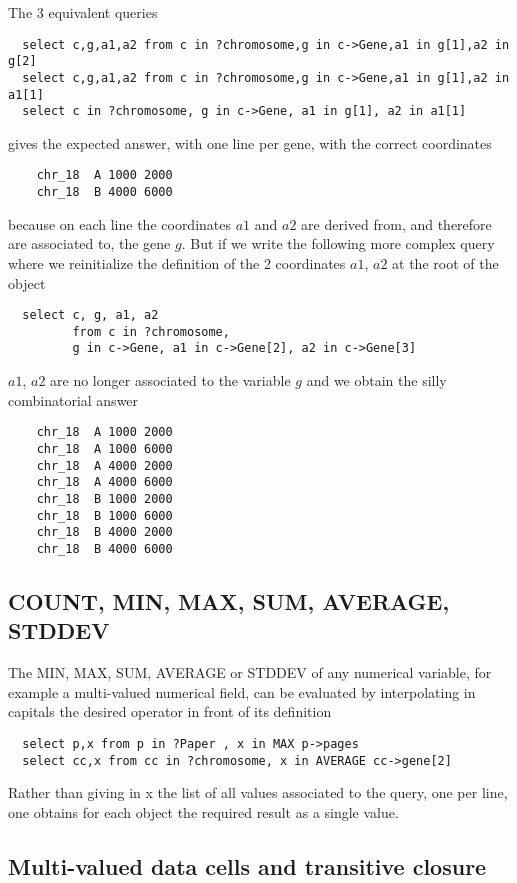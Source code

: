 \documentclass[11pt]{article}
\newcommand{\BL}{\begin{lstlisting}}
\begin{document}
The 3 equivalent queries
\BL
  select c,g,a1,a2 from c in ?chromosome,g in c->Gene,a1 in g[1],a2 in g[2]
  select c,g,a1,a2 from c in ?chromosome,g in c->Gene,a1 in g[1],a2 in a1[1]
  select c in ?chromosome, g in c->Gene, a1 in g[1], a2 in a1[1]
\end{lstlisting}
gives the expected answer, with one line per gene, with the correct coordinates
\BL
    chr_18  A 1000 2000
    chr_18  B 4000 6000
\end{lstlisting}
because on each line the coordinates $a1$ and $a2$ are derived from, and therefore are associated to, the gene $g$.
But if we write the following more complex query where we reinitialize the definition 
of the 2 coordinates $a1$, $a2$ at the root of the object
\BL
  select c, g, a1, a2 
         from c in ?chromosome,
         g in c->Gene, a1 in c->Gene[2], a2 in c->Gene[3]
\end{lstlisting}
$a1$, $a2$ are no longer associated to the variable $g$ and 
we obtain the silly combinatorial answer
\BL
    chr_18  A 1000 2000
    chr_18  A 1000 6000
    chr_18  A 4000 2000
    chr_18  A 4000 6000
    chr_18  B 1000 2000
    chr_18  B 1000 6000
    chr_18  B 4000 2000
    chr_18  B 4000 6000
\end{lstlisting}

\subsection{COUNT, MIN, MAX, SUM, AVERAGE, STDDEV}

The MIN, MAX, SUM, AVERAGE or STDDEV of any numerical variable,
for example a multi-valued numerical field, can be evaluated
by interpolating in capitals the desired operator in front of its definition
\BL
  select p,x from p in ?Paper , x in MAX p->pages
  select cc,x from cc in ?chromosome, x in AVERAGE cc->gene[2]
\end{lstlisting}
Rather than giving in x the list of all values associated to the query, one per line,
one obtains for each object the required result as a single value.


\subsection{Multi-valued data cells and transitive closure}
\end{document}
